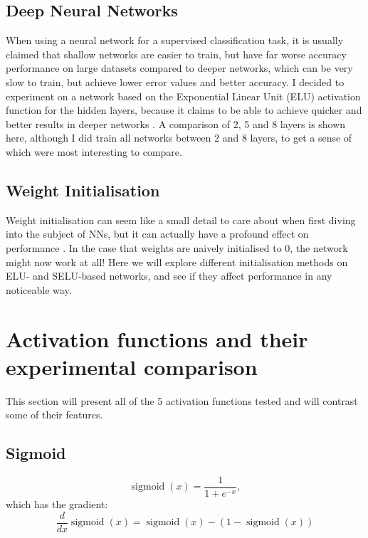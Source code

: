 \documentclass{article}
\DeclareMathOperator{\sigmoid}{sigmoid}
\begin{document}
\subsection{Deep Neural Networks}\label{sec:deep_nets}
When using a neural network for a supervised classification task, it is usually claimed that shallow networks are easier to train, but have far worse accuracy performance on large datasets compared to deeper networks, which can be very slow to train, but achieve lower error values and better accuracy. I decided to experiment on a network based on the Exponential Linear Unit (ELU) activation function for the hidden layers, because it claims to be able to achieve quicker and better results in deeper networks \citep{elu}. A comparison of 2, 5 and 8 layers is shown here, although I did train all networks between 2 and 8 layers, to get a sense of which were most interesting to compare. 

\subsection{Weight Initialisation}\label{sec:initialisation}
Weight initialisation can seem like a small detail to care about when first diving into the subject of NNs, but it can actually have a profound effect on performance \citep{intoli}. In the case that weights are naively initialised to 0, the network might now work at all! Here we will explore different initialisation methods on ELU- and SELU-based networks, and see if they affect performance in any noticeable way.

\section{Activation functions and their experimental comparison}\label{sec:actfn}
This section will present all of the 5 activation functions tested and will contrast some of their features.

\subsection{Sigmoid}\label{sec:sigmoid}
\begin{equation}
  \sigmoid(x) = \frac{1}{1 + e^{-x}} ,
\end{equation} 
which has the gradient:
\begin{equation}
  \frac{d}{dx} \sigmoid(x) = \sigmoid(x) - (1 - \sigmoid(x))
\end{equation}
\end{document}
